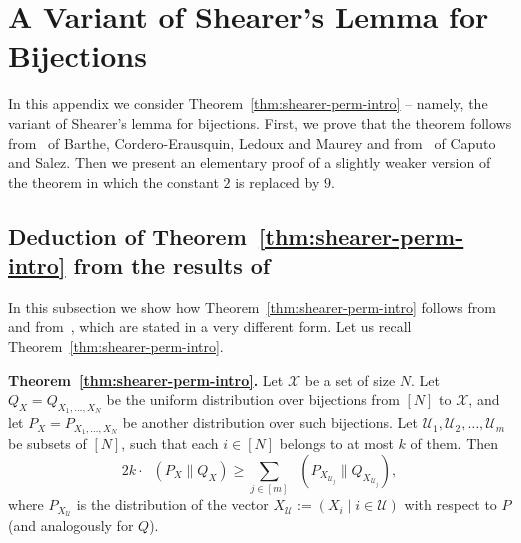 \documentclass[11pt]{article}
\DeclareMathOperator{\KL}{D_{\text{KL}}}
\newcommand{\Qcal}{\mathcal{U}}
\begin{document}
\section{A Variant of Shearer's Lemma for Bijections}
\label{app:shearer-perm}

In this appendix we consider Theorem~\ref{thm:shearer-perm-intro} -- namely, the variant of Shearer's lemma for bijections. First, we prove that the theorem follows from~\cite[Proposition~21]{BartheCLM11} of Barthe, Cordero-Erausquin, Ledoux and Maurey and from~\cite[Theorem~4]{CaputoS24} of Caputo and Salez.
Then we present an elementary proof of a slightly weaker version of the theorem in which the constant $2$ is replaced by $9$.

\subsection{Deduction of Theorem~\ref{thm:shearer-perm-intro} from the results of~\cite{BartheCLM11,CaputoS24}}
\label{sec:sub:Deduction}

In this subsection we show how Theorem~\ref{thm:shearer-perm-intro} follows from~\cite[Proposition~21]{BartheCLM11} and from~\cite[Theorem~4]{CaputoS24}, which are stated in a very different form. Let us recall Theorem~\ref{thm:shearer-perm-intro}.

\medskip \noindent \textbf{Theorem~\ref{thm:shearer-perm-intro}.} Let $\mathcal{X}$ be a set of size $N$. Let $Q_X = Q_{X_1,\ldots,X_N}$ be the uniform distribution over bijections from $[N]$ to $\mathcal{X}$,
and let $P_X = P_{X_1,\ldots,X_N}$ be another distribution over such bijections. Let 
$\Qcal_1,\Qcal_2,\ldots,\Qcal_m$ be subsets of $[N]$, such that each $i \in [N]$ belongs to at most $k$ of them. Then
$$
2k \cdot  \KL( P_X \| Q_X ) \geq \sum_{j \in [m]} \KL( P_{X_{\mathcal{U}_j}} \| Q_{X_{\mathcal{U}_j}} ),$$
where $P_{X_{\mathcal{U}}}$ is the distribution of the vector $X_{\mathcal{U}} := \left(X_i \mid i \in \mathcal{U} \right)$ with respect to $P$ (and analogously for $Q$).
\end{document}

